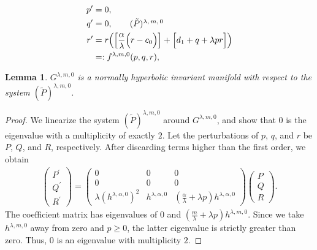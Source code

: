 \documentclass[a4paper,11pt]{article}
\newtheorem{lemma}{Lemma}[section]
\begin{document}
\begin{align} 
 p^\prime &=0, \nonumber \\
 q^\prime &=0, \tag*{($\tilde{P}$)\textsuperscript{$\lambda,m,0$}}\label{eq:pqr_fast} \\%
 r^\prime&=r\Big( \Big[\frac{\alpha}{\lambda}\Big(r-c_0\Big)\Big]+\Big[d_1 + q + \lambda pr\Big]\Big)\nonumber \\
 &=:f^{\lambda,m,0}(p,q,r), \nonumber
\end{align}

\begin{lemma} \label{lem:normal_hyper}
 $G^{\lambda,m,0}$ is a normally hyperbolic invariant manifold with respect to the system $(\tilde{P})^{ \lambda,m,0}$.
\end{lemma}
\begin{proof}
We linearize the system $(\tilde{P})^{ \lambda,m,0}$ around $G^{\lambda,m,0}$, and show that $0$ is the eigenvalue with a multiplicity of exactly $2$. Let the perturbations of $p$, $q$, and $r$ be $P$, $Q$, and $R$, respectively. After discarding  terms higher than the first order, we obtain
\begin{align*}
 \begin{pmatrix} {P}^\prime\\ {Q}^\prime \\ {R}^\prime \end{pmatrix} =
 \begin{pmatrix} 0 & 0& 0\\ 0 & 0 & 0\\ \lambda (h^{\lambda,\alpha,0})^2 & h^{\lambda,\alpha,0} & ( \frac{\alpha}{ \lambda} + \lambda p )h^{\lambda,\alpha,0} \end{pmatrix} \begin{pmatrix} {P}\\ {Q} \\ {R} \end{pmatrix}.
\end{align*}
The coefficient matrix has eigenvalues of $0$ and $( \frac{m}{ \lambda} + \lambda p )h^{\lambda,m,0}$. Since we take $h^{\lambda,m,0}$ away from zero and $p \ge 0$, the latter eigenvalue is strictly greater than zero. Thus, $0$ is an eigenvalue with multiplicity $2$. %
\end{proof}
\end{document}
